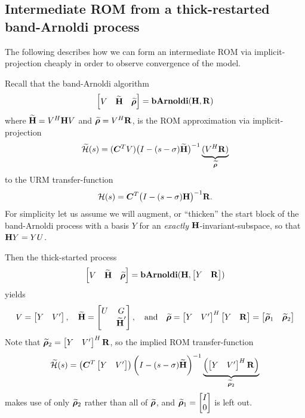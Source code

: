 \clearpage
\subsection{Intermediate ROM from a thick-restarted band-Arnoldi process}
The following describes how we can form an intermediate ROM via implicit-projection cheaply in order to observe convergence of the model.
  
Recall that the band-Arnoldi algorithm 
\begin{equation}
\mat{V & \Himp & \rrimp} = \bA(\H,\RR)
\label{eq:bAalg}
\end{equation}
where $\widetilde{\textbf{\textup{H}}} = V^H\textbf{\textup{H}} V$ and $\widetilde{\boldsymbol{\rho}} = V^H \textbf{\textup{R}}$, is the ROM approximation via implicit-projection 
\begin{equation}
\tfimp(s) = (\CC^T V)\big( I - (s-\sigma) \Himp \big)^{-1} \underbrace{(\c{V}\RR)}_{\rrimp}
\label{eg:bA_tfimp}
\end{equation}
to the URM transfer-function 
\begin{equation*}
\mathcal{H}(s) = \bm{C}^T\big( I - (s-\sigma) \textbf{\textup{H}} \big)^{-1}\textbf{\textup{R}}. 
\end{equation*}
For simplicity let us assume we will augment, or ``thicken'' the start block of the band-Arnoldi process with a basis $Y$ for an \emph{exactly} $\textbf{\textup{H}}$-invariant-subspace, so that $\textbf{\textup{H}} Y = Y U$.  

Then the thick-started process
\begin{equation}
\mat{V & \Himp & \rrimp} = \bA(\H,\mat{Y &\RR})
\label{eq:thick_bAalg}
\end{equation}
yields 
\begin{equation*}
V = \begin{bmatrix} Y&V^\prime\end{bmatrix}, \quad \widetilde{\textbf{\textup{H}}} = \begin{bmatrix} U&G\\&\widetilde{\textbf{\textup{H}}}^\prime\end{bmatrix},   
\quad\text{and}\quad
\widetilde{\boldsymbol{\rho}} = \begin{bmatrix} Y&V^\prime\end{bmatrix}^H\begin{bmatrix} Y &\textbf{\textup{R}}\end{bmatrix} = \begin{bmatrix} \widetilde{\boldsymbol{\rho}}_1 & \widetilde{\boldsymbol{\rho}}_2\end{bmatrix}
\end{equation*}
Note that $\widetilde{\boldsymbol{\rho}}_2 = \begin{bmatrix} Y&V^\prime\end{bmatrix}^H \textbf{\textup{R}}$, so the implied ROM transfer-function
 \begin{equation}
\tfimp(s) = \left( \CC^T\mat{Y&V^\prime} \right)
\bigg( I - (s-\sigma) \Himp \bigg)^{-1} \underbrace{\left(\c{\mat{Y&V^\prime}}\RR \right) }_{\rrimp_2}
\label{eg:thick_bA_tfimp}
\end{equation}
makes use of only $\widetilde{\boldsymbol{\rho}}_2$ rather than all of $\widetilde{\boldsymbol{\rho}}$, and  $\widetilde{\boldsymbol{\rho}}_1 = \begin{bmatrix} I\\0\end{bmatrix}$ is left out. 
 
\clearpage
